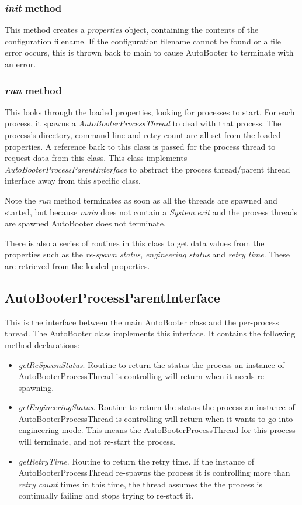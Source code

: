 \documentclass[10pt,a4paper]{article}
\begin{document}
\subsubsection{{\em init} method}
This method creates a {\em properties} object, containing the contents of the configuration filename.
If the configuration filename cannot be found or a file error occurs, this is thrown back to
main to cause AutoBooter to terminate with an error.

\subsubsection{{\em run} method}
This looks through the loaded properties, looking for processes to start. For each process, it spawns a
{\em AutoBooterProcessThread} to deal with that process. The process's directory, command line and
retry count are all set from the loaded properties. A reference back to this class is passed 
for the process thread to request data from this class. This class implements {\em AutoBooterProcessParentInterface}
to abstract the process thread/parent thread interface away from this specific class.

Note the {\em run} method terminates as soon as all the threads are spawned and started, but because 
{\em main} does not contain a {\em System.exit} and the process threads are spawned AutoBooter does not terminate.

There is also a series of routines in this class to get data values from the properties such as
the {\em re-spawn status}, {\em engineering status} and {\em retry time}. These are retrieved from
the loaded properties.

\subsection{AutoBooterProcessParentInterface}
This is the interface between the main AutoBooter class and the per-process thread. The AutoBooter 
class implements this interface. It contains the following method declarations:
\begin{itemize}
\item {\em getReSpawnStatus}. Routine to return the status the process an instance of 
	AutoBooterProcessThread is controlling
	 will return when it needs re-spawning.
\item {\em getEngineeringStatus}. Routine to return the status the process an instance of AutoBooterProcessThread 
	is controlling will return when it wants to go into engineering mode. 
	This means the AutoBooterProcessThread for this process will terminate, and not re-start the process.
\item {\em getRetryTime}. Routine to return the retry time. If the instance of AutoBooterProcessThread re-spawns the
	process it is controlling more than {\em retry count} times in this time, the thread assumes the
	the process is continually failing and stops trying to re-start it.
\end{itemize}
\end{document}
